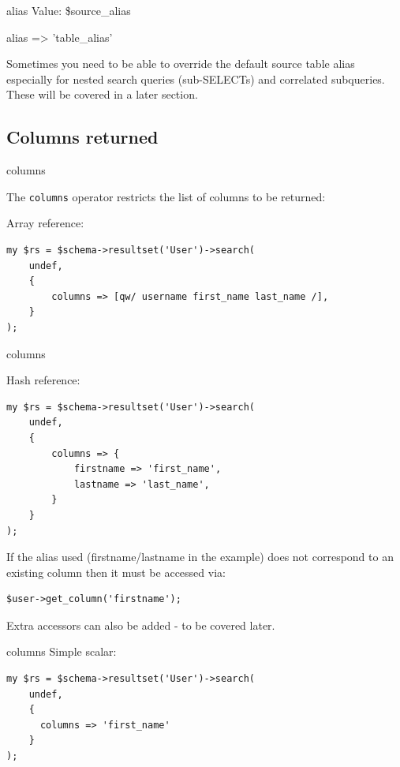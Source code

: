 \begin{frame}[fragile]{alias}
Value: \$source\_alias

    alias => 'table\_alias'

\end{frame}

Sometimes you need to be able to override the default source table alias especially for nested search queries (sub-SELECTs) and correlated subqueries. These will be covered in a later section.

\subsection{Columns returned}
\begin{frame}[fragile]{columns}

The \verb|columns| operator restricts the list of columns to be returned:


Array reference:

\begin{lstlisting}
my $rs = $schema->resultset('User')->search(
    undef,
    {
        columns => [qw/ username first_name last_name /],
    }
);
\end{lstlisting}
\end{frame}

\begin{frame}[fragile]{columns}

Hash reference:

\begin{lstlisting}
my $rs = $schema->resultset('User')->search(
    undef,
    {
        columns => {
            firstname => 'first_name',
            lastname => 'last_name',
        }
    }
);
\end{lstlisting}
\end{frame}

If the alias used (firstname/lastname in the example) does not correspond to
an existing column then it must be accessed via:

\begin{lstlisting}
$user->get_column('firstname');
\end{lstlisting}

Extra accessors can also be added - to be covered later.


\begin{frame}[fragile]{columns}
Simple scalar:

\begin{lstlisting}
my $rs = $schema->resultset('User')->search(
    undef,
    {
      columns => 'first_name'
    }
);
\end{lstlisting}

\end{frame}

